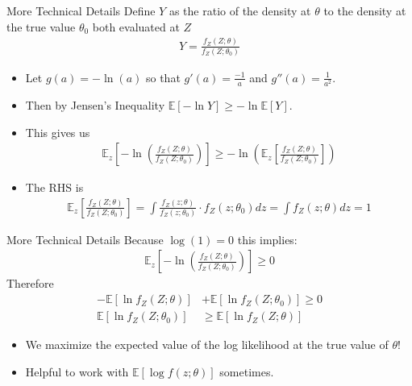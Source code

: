 \begin{frame}{More Technical Details}
Define $Y$ as the ratio of the density at $\theta$ to the density at the true value $\theta_0$ both evaluated at $Z$
\begin{align*}
Y = \frac{f_Z(Z;\theta)}{f_Z(Z;\theta_0)}
\end{align*}
\vspace{-0.5cm}
\begin{itemize}
\item Let $g(a) = -\ln(a)$ so that $g'(a) = \frac{-1}{a}$ and $g''(a) =\frac{1}{a^2}$.
\item Then by \alert{Jensen's Inequality} $\mathbb{E}[- \ln Y] \geq - \ln \mathbb{E}[Y]$.
\item This gives us
\begin{align*}
\mathbb { E }_z \left[ - \ln \left( \frac { f _ { Z } ( Z ; \theta ) } { f _ { Z } \left( Z ; \theta _ { 0 } \right) } \right) \right] \geq - \ln \left( \mathbb { E }_z \left[ \frac { f _ { Z } ( Z ; \theta ) } { f _ { Z } \left( Z ; \theta _ { 0 } \right) } \right] \right)
\end{align*}
\item The RHS is
\begin{align*}
\mathbb { E }_z \left[ \frac { f _ { Z } ( Z ; \theta ) } { f _ { Z } \left( Z ; \theta _ { 0 } \right) } \right] = \int \frac { f _ { Z } ( z ; \theta ) } { f _ { Z } \left( z ; \theta _ { 0 } \right) } \cdot f _ { Z } \left( z ; \theta _ { 0 } \right) d z = \int f _ { Z } ( z ; \theta ) d z = 1
\end{align*}
\end{itemize}
\end{frame}


\begin{frame}{More Technical Details}
Because $\log(1)=0$ this implies:
\begin{align*}
\mathbb { E }_z \left[ - \ln \left( \frac { f _ { Z } ( Z ; \theta ) } { f _ { Z } \left( Z ; \theta _ { 0 } \right) } \right) \right] \geq 0
\end{align*}
Therefore 
\begin{align*}
- \mathbb { E } \left[ \ln f _ { Z } ( Z ; \theta ) \right] &+ \mathbb { E } \left[ \ln f _ { Z } \left( Z ; \theta _ { 0 } \right) \right] \geq 0\\
\mathbb { E } \left[ \ln f _ { Z } \left( Z ; \theta _ { 0 } \right) \right] &\geq \mathbb { E } \left[ \ln f _ { Z } ( Z ; \theta ) \right]
\end{align*}
\begin{itemize}
\item We maximize the expected value of the log likelihood at the true value of $\theta$!
\item Helpful to work with $\mathbb{E}[\log f(z; \theta)]$ sometimes.
\end{itemize}
\end{frame}


